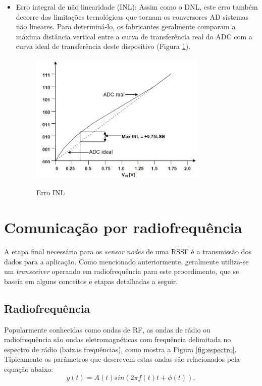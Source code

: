 \documentclass[oneside,openright,12pt]{ufsm_2015} %
\begin{document}
\begin{itemize}
    \item Erro integral de não linearidade (INL):
    Assim como o DNL, este erro também decorre das limitações tecnológicas que tornam os conversores AD sistemas não lineares. Para determiná-lo, os fabricantes geralmente comparam a máxima distância vertical entre a curva de transferência real do ADC com a curva ideal de transferência deste dispositivo (Figura \ref{fig:inl-adc}).
    
    \begin{figure}[H]
    \caption{\label{exepretex} Erro INL}
    \centering
    \includegraphics[width=0.8\textwidth]{figuras/adc-inl.png}
    \vspace{\baselineskip} %
        \label{fig:inl-adc}
    \end{figure}
\end{itemize}


\section{Comunicação por radiofrequência}
A etapa final necessária para os \textit{sensor nodes} de uma RSSF é a transmissão dos dados para a aplicação. Como mencionado anteriormente, geralmente utiliza-se um \textit{transceiver} operando em radiofrequência para este procedimento, que se baseia em alguns conceitos e etapas detalhadas a seguir.

\subsection{Radiofrequência}
Popularmente conhecidas como ondas de RF, as ondas de rádio ou radiofrequência são ondas eletromagnéticas com frequência delimitada no espectro de rádio (baixas frequências), como mostra a Figura \ref{fig:espectro}. Tipicamente os parâmetros que descrevem estas ondas são relacionados pela equação abaixo:
\begin{equation}
    y(t) = A(t)sin(2\pi f(t)t + \phi (t)),
\end{equation}
\end{document}
